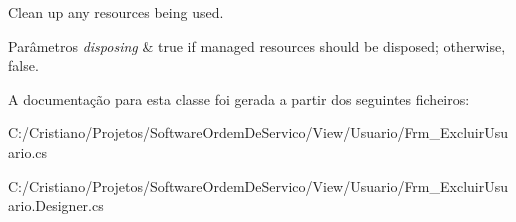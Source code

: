 Clean up any resources being used. 


\begin{DoxyParams}{Parâmetros}
{\em disposing} & true if managed resources should be disposed; otherwise, false.\\
\hline
\end{DoxyParams}


A documentação para esta classe foi gerada a partir dos seguintes ficheiros\+:\begin{DoxyCompactItemize}
\item 
C\+:/\+Cristiano/\+Projetos/\+Software\+Ordem\+De\+Servico/\+View/\+Usuario/Frm\+\_\+\+Excluir\+Usuario.\+cs\item 
C\+:/\+Cristiano/\+Projetos/\+Software\+Ordem\+De\+Servico/\+View/\+Usuario/Frm\+\_\+\+Excluir\+Usuario.\+Designer.\+cs\end{DoxyCompactItemize}
